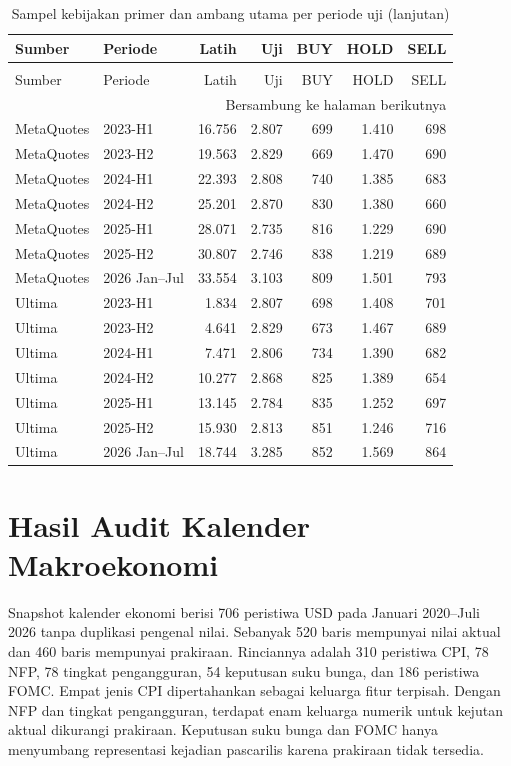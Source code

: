 \begingroup
\small
\setlength{\tabcolsep}{4pt}
\begin{longtable}{llrrrrr}
\caption{Sampel kebijakan primer dan ambang utama per periode uji}\label{tab:hasil-sampel-periode}\\
\toprule
Sumber & Periode & Latih & Uji & BUY & HOLD & SELL \\
\midrule
\endfirsthead
\caption[]{Sampel kebijakan primer dan ambang utama per periode uji (lanjutan)}\\
\toprule
Sumber & Periode & Latih & Uji & BUY & HOLD & SELL \\
\midrule
\endhead
\midrule
\multicolumn{7}{r}{Bersambung ke halaman berikutnya} \\
\endfoot
\endlastfoot
MetaQuotes & 2023-H1 & 16.756 & 2.807 & 699 & 1.410 & 698 \\
MetaQuotes & 2023-H2 & 19.563 & 2.829 & 669 & 1.470 & 690 \\
MetaQuotes & 2024-H1 & 22.393 & 2.808 & 740 & 1.385 & 683 \\
MetaQuotes & 2024-H2 & 25.201 & 2.870 & 830 & 1.380 & 660 \\
MetaQuotes & 2025-H1 & 28.071 & 2.735 & 816 & 1.229 & 690 \\
MetaQuotes & 2025-H2 & 30.807 & 2.746 & 838 & 1.219 & 689 \\
MetaQuotes & 2026 Jan--Jul & 33.554 & 3.103 & 809 & 1.501 & 793 \\
Ultima & 2023-H1 & 1.834 & 2.807 & 698 & 1.408 & 701 \\
Ultima & 2023-H2 & 4.641 & 2.829 & 673 & 1.467 & 689 \\
Ultima & 2024-H1 & 7.471 & 2.806 & 734 & 1.390 & 682 \\
Ultima & 2024-H2 & 10.277 & 2.868 & 825 & 1.389 & 654 \\
Ultima & 2025-H1 & 13.145 & 2.784 & 835 & 1.252 & 697 \\
Ultima & 2025-H2 & 15.930 & 2.813 & 851 & 1.246 & 716 \\
Ultima & 2026 Jan--Jul & 18.744 & 3.285 & 852 & 1.569 & 864 \\
\bottomrule
\end{longtable}
\endgroup


\section{Hasil Audit Kalender Makroekonomi}

Snapshot kalender ekonomi berisi 706 peristiwa USD pada Januari 2020--Juli 2026 tanpa duplikasi pengenal nilai. Sebanyak 520 baris mempunyai nilai aktual dan 460 baris mempunyai prakiraan. Rinciannya adalah 310 peristiwa CPI, 78 NFP, 78 tingkat pengangguran, 54 keputusan suku bunga, dan 186 peristiwa FOMC. Empat jenis CPI dipertahankan sebagai keluarga fitur terpisah. Dengan NFP dan tingkat pengangguran, terdapat enam keluarga numerik untuk kejutan aktual dikurangi prakiraan. Keputusan suku bunga dan FOMC hanya menyumbang representasi kejadian pascarilis karena prakiraan tidak tersedia.

